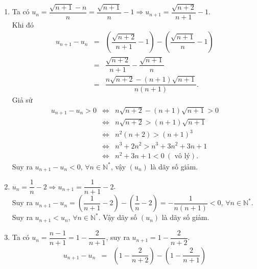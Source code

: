 \begin{ex}
{\begin{enumerate}
\begin{eqnarray*}
				u_{n+1}-u_n&=&\dfrac{n+1}{n^2+2n+2}-\dfrac{n}{n^2+1}\\ 
				&=&\dfrac{(n+1)\left(n^2+1\right)-n\left(n^2+2n+2\right)}{\left(n^2+1\right)\left(n^2+2n+2\right)}\\ 
				&=&\dfrac{n^3+n^2+n+1-n^3-2n^2-2n}{\left(n^2+1\right)\left(n^2+2n+2\right)}\\ 
				&=&\dfrac{-n^2-n+1}{\left(n^2+1\right)\left(n^2+2n+2\right)} < 0,\forall n  \geq 1.
			\end{eqnarray*}
			Vậy $(u_n)$ là dãy  số giảm.
			\item Ta có $u_n=\dfrac{\sqrt{n+1}-n}{n}=\dfrac{\sqrt{n+1}}{n}-1 \Rightarrow u_{n+1}=\dfrac{\sqrt{n+2}}{n+1}-1$.\\ 
			Khi đó \allowdisplaybreaks 
			\begin{eqnarray*}
				u_{n+1}-u_n&=&\left(\dfrac{\sqrt{n+2}}{n+1}-1\right)-\left(\dfrac{\sqrt{n+1}}{n}-1\right)\\ 
				 &=&\dfrac{\sqrt{n+2}}{n+1}-\dfrac{\sqrt{n+1}}{n}\\
				&=&\dfrac{n \sqrt{n+2}-(n+1)  \sqrt{n+1}}{n(n+1)}.
			\end{eqnarray*}
			 Giả sử
			\allowdisplaybreaks 
			\begin{eqnarray*}
				u_{n+1}-u_n>0 &\Leftrightarrow&  n \sqrt{n+2}-(n+1) \sqrt{n+1}>0\\
				& \Leftrightarrow&  n \sqrt{n+2}>(n+1) \sqrt{n+1}\\
				&\Leftrightarrow&  n^2(n+2)>(n+1)^3\\
				& \Leftrightarrow& n^3+2 n^2>n^3+3 n^2+3 n+1\\ &\Leftrightarrow &n^2+3  n+1<0 ~(\text { vô lý}).
			\end{eqnarray*}
			Suy ra $u_{n+1}-u_n<0$, $\forall n\in\mathbb{N}^*$,  vậy $\left(u_n\right)$ là dãy số giảm.
			 \item $u_n=\dfrac{1}{n}-2 \Rightarrow u_{n+1}=\dfrac{1}{n+1}-2$.\\
			 Suy ra $u_{n+1}-u_n=\left(\dfrac{1}{n+1}-2\right)-\left(\dfrac{1}{n}-2\right)=-\dfrac{1}{n(n+1)}<0$, $\forall n\in\mathbb{N}^*$.\\
			Suy ra $u_{n+1}<u_n$, $\forall  n\in\mathbb{N}^*$. Vậy dãy số $\left(u_n\right)$ là dãy số giảm.
			\item Ta có $u_n=\dfrac{n-1}{n+1}=1-\dfrac{2}{n+1}$, suy ra $u_{n+1}=1-\dfrac{2}{n+2}$.\\ 
			 \allowdisplaybreaks
			\begin{eqnarray*}
				 u_{n+1}-u_n&=&\left(1-\dfrac{2}{n+2}\right)-\left(1-\dfrac{2}{n+1}\right)\\

\end{eqnarray*}
\end{enumerate}}
\end{ex}
